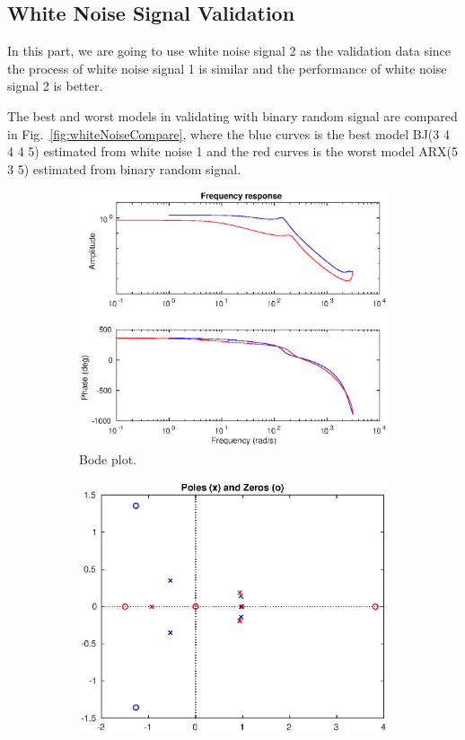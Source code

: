 \documentclass[10pt,a4paper]{article}
\begin{document}
\subsection{White Noise Signal Validation}
\par In this part, we are going to use white noise signal 2 as the validation data since the process of white noise signal 1 is similar and the performance of white noise signal 2 is better.
\par The best and worst models in validating with binary random signal are compared in Fig.~\ref{fig:whiteNoiseCompare}, where the blue curves is the best model BJ(3 4 4 4 5) estimated from white noise 1 and the red curves is the worst model ARX(5 3 5) estimated from binary random signal.
	\begin{figure}[ht]
		\footnotesize
		\centering
		\begin{subfigure}[t]{.32\linewidth}
		\centering\includegraphics[width=\linewidth]{whiteNoiseFrequencyResponse.eps}
		\caption{Bode plot.}
		\end{subfigure}
		\begin{subfigure}[t]{.32\linewidth}
		\centering\includegraphics[width=\linewidth]{whiteNoisePolesZeros.eps}

\end{subfigure}
\end{figure}
\end{document}
